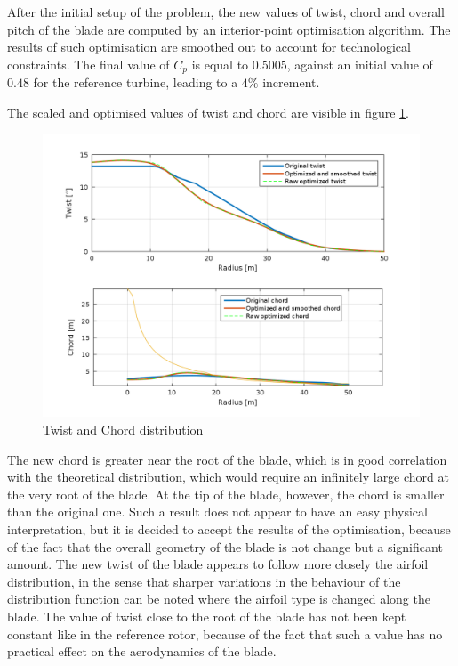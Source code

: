 After the initial setup of the problem, the new values of twist, chord and overall pitch of the blade are computed by an interior-point optimisation algorithm. The results of such optimisation are smoothed out to account for technological constraints. The final value of $C_p$ is equal to $0.5005$, against an initial value of $0.48$ for the reference turbine, leading to a $4\%$ increment.

The scaled and optimised values of twist and chord are visible in figure \ref{fig:twist_and_chord}.

\begin{figure}[H]
\centering
\includegraphics[width=1.0\textwidth]{Images/twist_and_chord.png} 
\caption{Twist and Chord distribution}\label{fig:twist_and_chord}
\end{figure}

The new chord is greater near the root of the blade, which is in good correlation with the theoretical distribution, which would require an infinitely large chord at the very root of the blade. At the tip of the blade, however, the chord is smaller than the original one. Such a result does not appear to have an easy physical interpretation, but it is decided to accept the results of the optimisation, because of the fact that the overall geometry of the blade is not change but a significant amount. 
The new twist of the blade appears to follow more closely the airfoil distribution, in the sense that sharper variations in the behaviour of the distribution function can be noted where the airfoil type is changed along the blade. The value of twist close to the root of the blade has not been kept constant like in the reference rotor, because of the fact that such a value has no practical effect on the aerodynamics of the blade.


